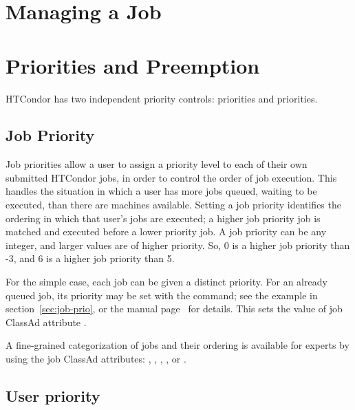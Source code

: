 \section{Managing a Job}


\section{\label{sec:Priorities}Priorities and Preemption}

HTCondor has two independent priority controls: 
priorities and  priorities.  

\subsection{Job Priority}

Job priorities allow a user to assign a priority level to
each of their own submitted HTCondor jobs,
in order to control the order of job execution.
This handles the situation in which a user has more jobs
queued, waiting to be executed, than there are machines available.
Setting a job priority identifies the ordering in which 
that user's jobs are executed; a higher job priority job is matched and
executed before a lower priority job.
A job priority can be any integer, and larger values are of higher priority.
So, 0 is a higher job priority than -3,
and 6 is a higher job priority than 5.

For the simple case, each job can be given a distinct priority.
For an already queued job, 
its priority may be set with the  command;
see the example in section~\ref{sec:job-prio}, or the
 manual page~\pageref{man-condor-prio} for details.
This sets the value of job ClassAd attribute . 

A fine-grained categorization of jobs and their ordering
is available for experts by using the job ClassAd attributes:
,
,
,
, or
.

\subsection{\label{sec:user-priority-explained}User priority}

